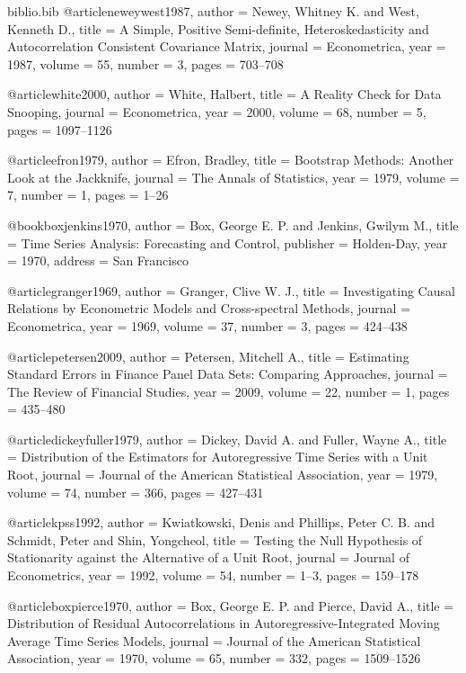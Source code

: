 \begin{filecontents*}[overwrite]{biblio.bib}
@article{neweywest1987,
  author  = {Newey, Whitney K. and West, Kenneth D.},
  title   = {A Simple, Positive Semi-definite, Heteroskedasticity and
             Autocorrelation Consistent Covariance Matrix},
  journal = {Econometrica},
  year    = {1987},
  volume  = {55},
  number  = {3},
  pages   = {703--708}
}

@article{white2000,
  author  = {White, Halbert},
  title   = {A Reality Check for Data Snooping},
  journal = {Econometrica},
  year    = {2000},
  volume  = {68},
  number  = {5},
  pages   = {1097--1126}
}

@article{efron1979,
  author  = {Efron, Bradley},
  title   = {Bootstrap Methods: Another Look at the Jackknife},
  journal = {The Annals of Statistics},
  year    = {1979},
  volume  = {7},
  number  = {1},
  pages   = {1--26}
}

@book{boxjenkins1970,
  author    = {Box, George E. P. and Jenkins, Gwilym M.},
  title     = {Time Series Analysis: Forecasting and Control},
  publisher = {Holden-Day},
  year      = {1970},
  address   = {San Francisco}
}

@article{granger1969,
  author  = {Granger, Clive W. J.},
  title   = {Investigating Causal Relations by Econometric Models and Cross-spectral Methods},
  journal = {Econometrica},
  year    = {1969},
  volume  = {37},
  number  = {3},
  pages   = {424--438}
}

@article{petersen2009,
  author  = {Petersen, Mitchell A.},
  title   = {Estimating Standard Errors in Finance Panel Data Sets: Comparing Approaches},
  journal = {The Review of Financial Studies},
  year    = {2009},
  volume  = {22},
  number  = {1},
  pages   = {435--480}
}

@article{dickeyfuller1979,
  author  = {Dickey, David A. and Fuller, Wayne A.},
  title   = {Distribution of the Estimators for Autoregressive Time Series with a Unit Root},
  journal = {Journal of the American Statistical Association},
  year    = {1979},
  volume  = {74},
  number  = {366},
  pages   = {427--431}
}

@article{kpss1992,
  author  = {Kwiatkowski, Denis and Phillips, Peter C. B. and Schmidt, Peter and Shin, Yongcheol},
  title   = {Testing the Null Hypothesis of Stationarity against the Alternative of a Unit Root},
  journal = {Journal of Econometrics},
  year    = {1992},
  volume  = {54},
  number  = {1--3},
  pages   = {159--178}
}

@article{boxpierce1970,
  author  = {Box, George E. P. and Pierce, David A.},
  title   = {Distribution of Residual Autocorrelations in Autoregressive-Integrated Moving Average Time Series Models},
  journal = {Journal of the American Statistical Association},
  year    = {1970},
  volume  = {65},
  number  = {332},
  pages   = {1509--1526}
}


\end{filecontents*}
